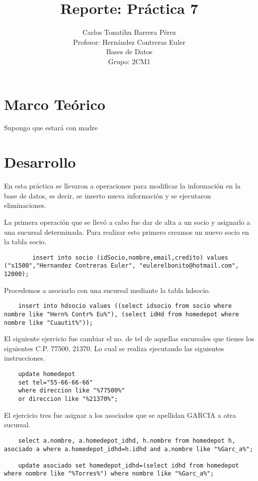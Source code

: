 \documentclass[12pt, titlepage]{article}
\title{Reporte: Práctica 7}
\author{Carlos Tonatihu Barrera Pérez \\ Profesor: Hernández Contreras Euler \\ Bases de Datos \\ Grupo: 2CM1 }
\begin{document}
	\maketitle
	\tableofcontents
	\section{Marco Teórico}
	Supongo que estará con madre
	\section{Desarrollo}
	En esta práctica se llevaron a operaciones para modificar la información en la base de datos, es decir, se inserto nueva información y se ejecutaron eliminaciones.
	
	La primera operación que se llevó a cabo fue dar de alta a un socio y asignarlo a una sucursal determinada. Para realizar esto primero creamos un nuevo socio en la tabla socio. 
	\begin{lstlisting}
		insert into socio (idSocio,nombre,email,credito) values ("s1500","Hernandez Contreras Euler", "eulerelbonito@hotmail.com", 12000);
	\end{lstlisting}
	Procedemos a asociarlo con una sucursal mediante la tabla hdsocio.
	\begin{lstlisting}
	insert into hdsocio values ((select idsocio from socio where nombre like "Hern% Contr% Eu%"), (select idHd from homedepot where nombre like "Cuautit%"));
	\end{lstlisting}
	
	El siguiente ejercicio fue cambiar el no. de tel de aquellas sucursales que tienes los siguientes C.P. 77500, 21370. Lo cual se realiza ejecutando las siguientes instrucciones.
	\begin{lstlisting}
	update homedepot
	set tel="55-66-66-66" 
	where direccion like "%77500%" 
	or direccion like "%21370%";
	\end{lstlisting}
	
	
	El ejercicio tres fue asignar a los asociados que se apellidan GARCIA a otra sucursal.
	\begin{lstlisting}
	select a.nombre, a.homedepot_idhd, h.nombre	from homedepot h, asociado a where a.homedepot_idhd=h.idhd and a.nombre like "%Garc_a%";
	
	update asociado set homedepot_idhd=(select idhd from homedepot where nombre like "%Torres%") where nombre like "%Garc_a%";
	\end{lstlisting}
	
\end{document}
